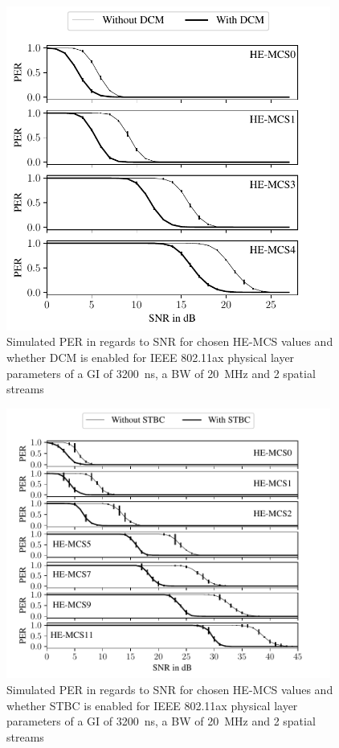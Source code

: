 \begin{figure}%
	\centering
	\includegraphics[width=0.95\textwidth]{figures/DCM_PER_to_SNR.pdf}
	\caption{Simulated \ac{PER} in regards to \ac{SNR} for chosen HE-\ac{MCS} values and whether \ac{DCM} is enabled for IEEE 802.11ax physical layer parameters of a \ac{GI} of \SI{3200}{\nano\second}, a \ac{BW} of \SI{20}{\mega\hertz} and 2 spatial streams}%
	\label{fig:PER_SNR_DCM}%
\end{figure}

\begin{figure}%
	\centering
	\includegraphics[width=0.95\textwidth]{figures/STBC_PER_to_SNR.pdf}
	\caption{Simulated \ac{PER} in regards to \ac{SNR} for chosen HE-\ac{MCS} values and whether \ac{STBC} is enabled for IEEE 802.11ax physical layer parameters of a \ac{GI} of \SI{3200}{\nano\second}, a \ac{BW} of \SI{20}{\mega\hertz} and 2 spatial streams}%
	\label{fig:PER_SNR_STBC}%
\end{figure}